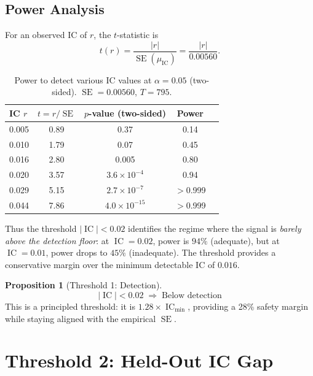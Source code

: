 \documentclass[11pt,a4paper]{article}
\theoremstyle{definition}
\newtheorem{proposition}{Proposition}[section]
\newcommand{\IC}{\operatorname{IC}}
\newcommand{\SE}{\operatorname{SE}}
\begin{document}
\subsection{Power Analysis}

For an observed IC of $r$, the $t$-statistic is
\begin{equation}
    t(r) = \frac{|r|}{\SE(\mu_{\IC})}
         = \frac{|r|}{0.00560}.
    \label{eq:t_stat_th1}
\end{equation}

\begin{table}[htbp]
\centering
\caption{Power to detect various IC values at $\alpha=0.05$ (two-sided).
         $\SE=0.00560$, $T=795$.}
\label{tab:power_v2}
\begin{tabular}{lcccc}
\toprule
IC $r$   & $t = r/\SE$ & $p$-value (two-sided) & Power \\
\midrule
0.005  & 0.89  & 0.37 & 0.14 \\
0.010  & 1.79  & 0.07 & 0.45 \\
0.016  & 2.80  & 0.005 & 0.80 \\
0.020  & 3.57  & $3.6\times10^{-4}$ & 0.94 \\
0.029  & 5.15  & $2.7\times10^{-7}$ & $>$0.999 \\
0.044  & 7.86  & $4.0\times10^{-15}$ & $>$0.999 \\
\bottomrule
\end{tabular}
\end{table}

Thus the threshold $|\IC| < 0.02$ identifies the regime where the
signal is \emph{barely above the detection floor}: at $\IC=0.02$,
power is $94\%$ (adequate), but at $\IC=0.01$, power drops to $45\%$
(inadequate). The threshold provides a conservative margin over the
minimum detectable IC of $0.016$.

\begin{proposition}[Threshold 1: Detection]
\label{prop:thresh1}
\begin{equation}
    \boxed{|\IC| < 0.02 \;\Longrightarrow\; \text{Below detection}}
\end{equation}
This is a principled threshold: it is $1.28\times\IC_{\min}$, providing
a 28\% safety margin while staying aligned with the empirical $\SE$.
\end{proposition}

\section{Threshold 2: Held-Out IC Gap}
\label{sec:thresh2}
\end{document}
